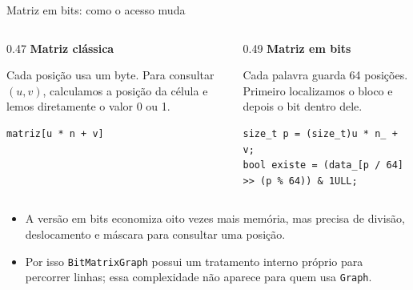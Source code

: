 \documentclass[10pt]{beamer}
\begin{document}
\begin{frame}[fragile]{Matriz em bits: como o acesso muda}
\begin{columns}[T]
\begin{column}{0.47\textwidth}
\textbf{Matriz cl\'assica}\par\smallskip
Cada posi\c c\~ao usa um byte. Para consultar $(u,v)$, calculamos a posi\c c\~ao
da c\'elula e lemos diretamente o valor 0 ou 1.

\begin{lstlisting}
matriz[u * n + v]
\end{lstlisting}
\end{column}
\begin{column}{0.49\textwidth}
\textbf{Matriz em bits}\par\smallskip
Cada palavra guarda 64 posi\c c\~oes. Primeiro localizamos o bloco e depois o
bit dentro dele.

\begin{lstlisting}
size_t p = (size_t)u * n_ + v;
bool existe = (data_[p / 64] >> (p % 64)) & 1ULL;
\end{lstlisting}
\end{column}
\end{columns}
\begin{itemize}
\item A vers\~ao em bits economiza oito vezes mais mem\'oria, mas precisa de
divis\~ao, deslocamento e m\'ascara para consultar uma posi\c c\~ao.
\item Por isso \texttt{BitMatrixGraph} possui um tratamento interno pr\'oprio
para percorrer linhas; essa complexidade n\~ao aparece para quem usa \texttt{Graph}.
\end{itemize}
\end{frame}
\end{document}
